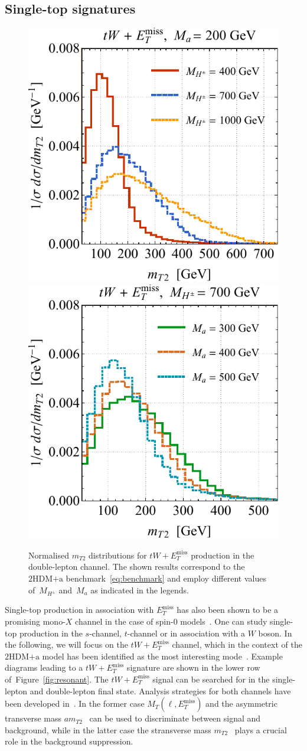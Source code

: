 \documentclass[a4paper, 11pt,notoc]{article}
\newcommand{\MET}{\ensuremath{E_T^\mathrm{miss}}\xspace}
\newcommand{\ma}{\ensuremath{M_{a}}\xspace}
\newcommand{\mHc}{\ensuremath{M_{H^{\pm}}}\xspace}
\newcommand{\hdma}{\ensuremath{\textrm{2HDM+a}}\xspace}
\begin{document}
\subsection*{Single-top signatures}

\begin{figure}[t!]
\centering
\includegraphics[height=0.45\textwidth]{mt2l.pdf} \qquad 
\includegraphics[height=0.45\textwidth]{mt2r.pdf}
\vspace{2mm}
\caption{\label{fig:mt2spectra} Normalised $m_{T2}$ distributions for $tW+\MET$ production in the double-lepton channel.  The shown results correspond to the \hdma benchmark~\eqref{eq:benchmark} and employ different values of~$\mHc$ and~$\ma$ as indicated in the legends.}
\end{figure}

Single-top production in association with $\MET$ has also been shown to be a promising mono-$X$ channel in the case of spin-0 models~\cite{Pinna:2017tay,Pani:2017qyd,Plehn:2017bys}. One can study single-top production in the $s$-channel, $t$-channel  or  in association with a $W$ boson. In the following, we will focus on the $tW + \MET$ channel, which in the context of the \hdma model has been identified as the most interesting mode~\cite{Pani:2017qyd}. Example diagrams leading to a $tW + \MET$ signature are shown in the lower row of~Figure~\ref{fig:resonant}. The $tW + \MET$ signal can be searched for in the single-lepton and double-lepton final state. Analysis strategies for both channels have been developed in~\cite{Pani:2017qyd}. In the former case $M_T (\ell, \MET)$ and the asymmetric transverse mass $am_{T2}$~\cite{Konar:2009qr,Lester:2014yga} can be used to discriminate between signal and background, while in the latter case the stransverse mass $m_{T2}$~\cite{Lester:1999tx,Barr:2003rg} plays a crucial role in the background suppression.
\end{document}
